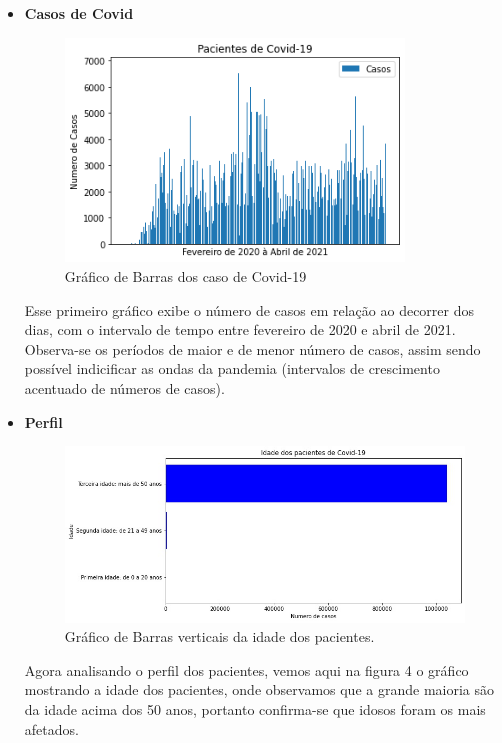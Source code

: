 \documentclass[tcc1]{uftex}
\begin{document}
 \begin{itemize}
 \setlength{\parindent}{1.25cm}
   \item\textbf{Casos de Covid}
   \begin{figure}[h]
    \centering
    \includegraphics[width=9cm]{GBarra.png}%
    \caption{Gráfico de Barras dos caso de Covid-19}
    \end{figure}
    
    Esse primeiro gráfico exibe o número de casos em relação ao decorrer dos dias, com o intervalo de tempo entre fevereiro de 2020 e abril de 2021. Observa-se os períodos de maior e de menor número de casos, assim sendo possível indicificar as ondas da pandemia (intervalos de crescimento acentuado de números de casos). 
   
   \item\textbf{Perfil}
    \begin{figure}[h]
    \centering
    \includegraphics[width=12cm]{Idade.jpg} %
    \caption{Gráfico de Barras verticais da idade dos pacientes.}
    \end{figure}
    
    Agora analisando o perfil dos pacientes, vemos aqui na figura 4 o gráfico mostrando a idade dos pacientes, onde observamos que a grande maioria são da idade acima dos 50 anos, portanto confirma-se que idosos foram os mais afetados.
    

\end{itemize}
\end{document}

